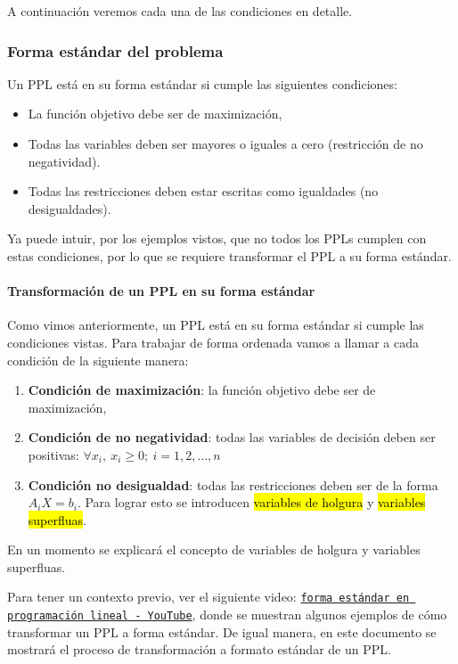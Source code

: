 A continuación veremos cada una de las condiciones en detalle.

\subsubsection{Forma estándar del problema}
\label{sec:forma_estandar}

Un PPL está en su forma estándar si cumple las siguientes condiciones:
\begin{itemize}
  \item La función objetivo debe ser de maximización,
  \item Todas las variables deben ser mayores o iguales a cero (restricción de no negatividad).
  \item Todas las restricciones deben estar escritas como igualdades (no desigualdades).
\end{itemize}
Ya puede intuir, por los ejemplos vistos, que no todos los PPLs cumplen con estas condiciones, por lo que se requiere transformar el PPL a su forma estándar.

\paragraph{Transformación de un PPL en su forma estándar}

Como vimos anteriormente, un PPL está en su forma estándar si cumple las condiciones vistas. Para trabajar de forma ordenada vamos a llamar a cada condición de la siguiente manera:
\begin{enumerate}
  \item \textbf{Condición de maximización}: la función objetivo debe ser de maximización,
  \item \textbf{Condición de no negatividad}: todas las variables de decisión deben ser positivas: \(\forall x_i,\ x_i \geq 0;\ i = 1,2,\ldots,n\)
  \item \textbf{Condición no desigualdad}: todas las restricciones deben ser de la forma \(A_iX = b_i\). Para lograr esto se introducen \hl{variables de holgura} y \hl{variables superfluas}.
\end{enumerate}
En un momento se explicará el concepto de variables de holgura y variables superfluas.

Para tener un contexto previo, ver el siguiente video: \href{https://www.youtube.com/watch?v=6f5K3O7yUzU}{\texttt{forma estándar en programación lineal - YouTube}}, donde se muestran algunos ejemplos de cómo transformar un PPL a forma estándar. De igual manera, en este documento se mostrará el proceso de transformación a formato estándar de un PPL. 

